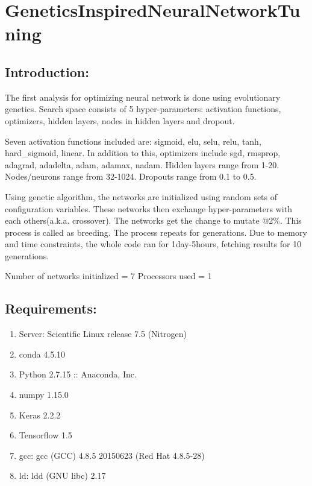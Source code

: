 \documentclass[]{article}
\date{}
\providecommand{\tightlist}{%
  \setlength{\itemsep}{0pt}\setlength{\parskip}{0pt}}
\begin{document}
\section{GeneticsInspiredNeuralNetworkTuning}\label{geneticsinspiredneuralnetworktuning}

\subsection{Introduction:}\label{introduction}

The first analysis for optimizing neural network is done using
evolutionary genetics. Search space consists of 5 hyper-parameters:
activation functions, optimizers, hidden layers, nodes in hidden layers
and dropout.

Seven activation functions included are: sigmoid, elu, selu, relu, tanh,
hard\_sigmoid, linear. In addition to this, optimizers include sgd,
rmsprop, adagrad, adadelta, adam, adamax, nadam. Hidden layers range
from 1-20. Nodes/neurons range from 32-1024. Dropouts range from 0.1 to
0.5.

Using genetic algorithm, the networks are initialized using random sets
of configuration variables. These networks then exchange
hyper-parameters with each others(a.k.a. crossover). The networks get
the change to mutate @2\%. This process is called as breeding. The
process repeats for generations. Due to memory and time constraints, the
whole code ran for 1day-5hours, fetching results for 10 generations.

Number of networks initialized = 7 Processors used = 1

\subsection{Requirements:}\label{requirements}

\begin{enumerate}
\def\labelenumi{\arabic{enumi}.}
\tightlist
\item
  Server: Scientific Linux release 7.5 (Nitrogen)
\item
  conda 4.5.10
\item
  Python 2.7.15 :: Anaconda, Inc.
\item
  numpy 1.15.0
\item
  Keras 2.2.2
\item
  Tensorflow 1.5
\item
  gcc: gcc (GCC) 4.8.5 20150623 (Red Hat 4.8.5-28)
\item
  ld: ldd (GNU libc) 2.17
\end{enumerate}
\end{document}
